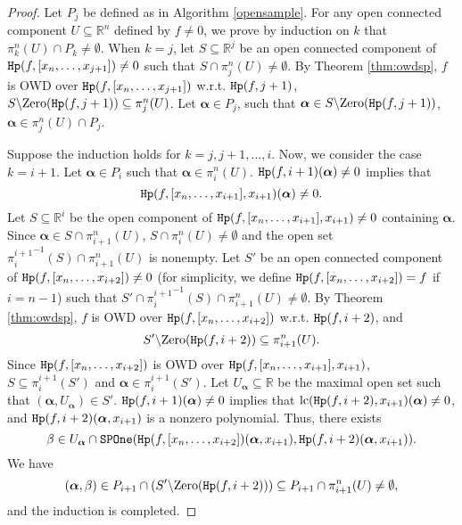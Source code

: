 \documentclass[amsthm]{elsart}
\def \lc  {{\rm lc}}
\def  \zero {{\rm Zero}}
\def  \Hproj {{\tt Hp}}
\def \RR {{\mathbb R}}
\newcommand{\va}{\bm{\alpha}}
\begin{document}
\begin{proof}
Let $P_j$ be defined as in Algorithm \ref{opensample}. For any open connected component $U\subseteq\RR^n$ defined by $f\neq0$, we prove by induction on $k$ that $\pi_{k}^n(U)\cap P_k\neq\emptyset$.
When $k=j$, let $S\subseteq\RR^j$ be an open connected component of $\Hproj(f,[x_n,\ldots,x_{j+1}])\neq0$ such that $S\cap \pi_{j}^n(U)\neq\emptyset$. By Theorem \ref{thm:owdsp}, $f$ is OWD over $\Hproj(f,[x_n,\ldots,x_{j+1}])$ w.r.t. $\Hproj(f,j+1)$, $S\backslash\zero(\Hproj(f,j+1))\subseteq \pi_{j}^n(U)$. Let $\va \in P_j$, such that $\va\in S\backslash\zero(\Hproj(f,j+1))$, $\va\in \pi_{j}^n(U)\cap P_j$.

Suppose the induction holds for $k=j,j+1,\ldots,i$. Now, we consider the case $k=i+1$. Let $\va\in P_i$ such that $\va\in \pi_{i}^n(U)$. $\Hproj(f,i+1)(\va)\neq0$ implies that $$\Hproj(f,[x_n,\ldots,x_{i+1}],x_{i+1})(\va)\neq0.$$
Let $S\subseteq\RR^i$ be the open component of $\Hproj(f,[x_n,\ldots,x_{i+1}],x_{i+1})\neq0$ containing $\va$.
 Since $\va\in S\cap\pi_{i+1}^n(U)$, $S\cap\pi_{i}^n(U)\neq \emptyset$ and the open set ${\pi_{i}^{i+1}}^{-1}(S)\cap\pi_{i+1}^n(U)$ is nonempty. Let $S'$ be an open connected component of $\Hproj(f,[x_n,\ldots,x_{i+2}])\neq0$ (for simplicity, we define $\Hproj(f,[x_n,\ldots,x_{i+2}])=f$ if $i=n-1$) such that $S'\cap {\pi_{i}^{i+1}}^{-1}(S)\cap\pi_{i+1}^n(U)\neq\emptyset$. By Theorem \ref{thm:owdsp}, $f$ is OWD over $\Hproj(f,[x_n,\ldots,x_{i+2}])$ w.r.t. $\Hproj(f,i+2)$, and
 $$S'\backslash\zero(\Hproj(f,i+2))\subseteq\pi_{i+1}^n(U).$$
 Since $\Hproj(f,[x_n,\ldots,x_{i+2}])$ is OWD over $\Hproj(f,[x_n,\ldots,x_{i+1}],x_{i+1})$, $S\subseteq\pi_{i}^{i+1}(S')$ and $\va\in\pi_{i}^{i+1}(S')$. Let $U_{\va}\subseteq\RR$ be the maximal open set such that $(\va,U_{\va})\in S'$. $\Hproj(f,i+1)(\va)\neq0$ implies that $\lc(\Hproj(f,i+2),x_{i+1})(\va)\neq0$, and $\Hproj(f,i+2)(\va,x_{i+1})$ is a nonzero polynomial. Thus, there exists
$$\beta\in U_{\va}\cap{\tt SPOne}(\Hproj(f,[x_n,\ldots,x_{i+2}])(\va,x_{i+1}), \Hproj(f,i+2)(\va,x_{i+1})).$$
We have
$$(\va,\beta)\in P_{i+1}\cap (S'\backslash\zero(\Hproj(f,i+2)))\subseteq P_{i+1}\cap \pi_{i+1}^n(U)\neq\emptyset,$$
and the induction is completed.
\end{proof}
\end{document}
